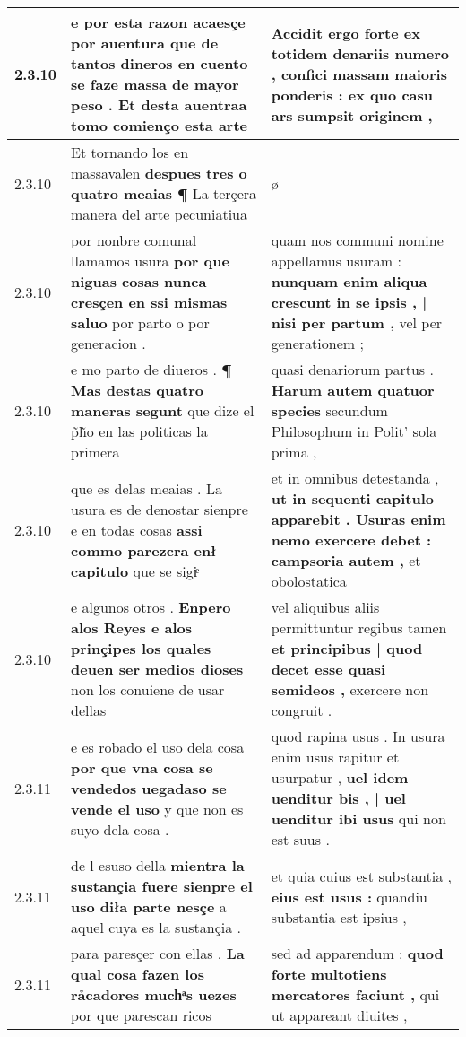 \begin{tabular}{|p{1cm}|p{6.5cm}|p{6.5cm}|}
2.3.10 & e por esta razon acaesçe por auentura \textbf{ que de tantos dineros en cuento se faze massa de mayor peso . } Et desta auentraa tomo comienço esta arte & Accidit ergo forte ex totidem denariis numero , \textbf{ confici massam maioris ponderis : } ex quo casu ars sumpsit originem , \\\hline
2.3.10 & Et tornando los en massavalen \textbf{ despues tres o quatro meaias ¶ } La terçera manera del arte pecuniatiua & ø \\\hline
2.3.10 & por nonbre comunal llamamos usura \textbf{ por que niguas cosas nunca cresçen en ssi mismas saluo } por parto o por generacion . & quam nos communi nomine appellamus usuram : \textbf{ nunquam enim aliqua crescunt in se ipsis , | nisi per partum , } vel per generationem ; \\\hline
2.3.10 & e mo parto de diueros . \textbf{ ¶ Mas destas quatro maneras segunt } que dize el p̃h̃o en las politicas la primera & quasi denariorum partus . \textbf{ Harum autem quatuor species } secundum Philosophum in Polit’ sola prima , \\\hline
2.3.10 & que es delas meaias . La usura es de denostar sienpre e en todas cosas \textbf{ assi commo parezcra enł capitulo } que se sigiͤ & et in omnibus detestanda , \textbf{ ut in sequenti capitulo apparebit . Usuras enim nemo exercere debet : campsoria autem , } et obolostatica \\\hline
2.3.10 & e algunos otros . \textbf{ Enpero alos Reyes e alos prinçipes los quales deuen ser medios dioses } non los conuiene de usar dellas & vel aliquibus aliis permittuntur regibus tamen \textbf{ et principibus | quod decet esse quasi semideos , } exercere non congruit . \\\hline
2.3.11 & e es robado el uso dela cosa \textbf{ por que vna cosa se vendedos uegadaso se vende el uso } y que non es suyo dela cosa . & quod rapina usus . In usura enim usus rapitur et usurpatur , \textbf{ uel idem uenditur bis , | uel uenditur ibi usus } qui non est suus . \\\hline
2.3.11 & de l esuso della \textbf{ mientra la sustançia fuere sienpre el uso diła parte nesçe } a aquel cuya es la sustançia . & et quia cuius est substantia , \textbf{ eius est usus : } quandiu substantia est ipsius , \\\hline
2.3.11 & para paresçer con ellas . \textbf{ La qual cosa fazen los rảcadores muchͣs uezes } por que parescan ricos & sed ad apparendum : \textbf{ quod forte multotiens mercatores faciunt , } qui ut appareant diuites , \\\hline

\end{tabular}

